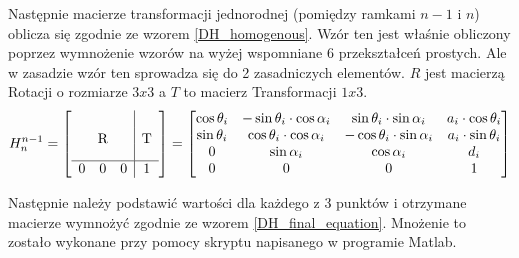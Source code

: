 Następnie macierze transformacji jednorodnej (pomiędzy ramkami $n-1$ i $n$) oblicza się zgodnie ze wzorem \ref{DH_homogenous}. Wzór ten jest właśnie obliczony poprzez wymnożenie wzorów na wyżej wspomniane 6 przekształceń prostych. Ale w zasadzie wzór ten sprowadza się do 2 zasadniczych elementów. $R$ jest macierzą Rotacji o rozmiarze $3x3$ a $T$ to macierz Transformacji $1x3$. \cite{DH_matrix_AA_article}\\

\begin{equation} \label{DH_homogenous}
H^{n-1}_n = 
\left[\begin{array}{ccc|c}
&&&\\
&&&\\
\multicolumn{3}{c|}{\smash{\raisebox{0.75\normalbaselineskip}{R}}} & \smash{\raisebox{0.75\normalbaselineskip}{T}}\\
\hline
0 & 0 & 0 & 1\\
\end{array}\right] = 
\left[\begin{matrix}
\cos{\theta_i} & -\sin{\theta_i} \cdot \cos{\alpha_i} & \sin{\theta_i} \cdot \sin{\alpha_i} & a_i \cdot \cos{\theta_i}\\
\sin{\theta_i} & \cos{\theta_i} \cdot \cos{\alpha_i} & -\cos{\theta_i} \cdot \sin{\alpha_i} & a_i \cdot \sin{\theta_i}\\
0 & \sin{\alpha_i} & \cos{\alpha_i} & d_i\\
0 & 0 & 0 & 1\\
\end{matrix}\right]
\end{equation}


Następnie należy podstawić wartości dla każdego z 3 punktów i otrzymane macierze wymnożyć zgodnie ze wzorem \ref{DH_final_equation}. Mnożenie to zostało wykonane przy pomocy skryptu napisanego w programie Matlab. %

